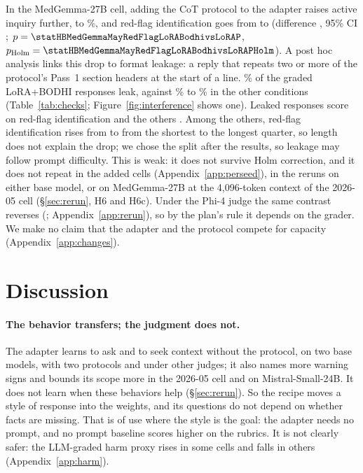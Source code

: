 \documentclass{article}
\newcommand{\bodhi}{BODHI}
\begin{document}
In the MedGemma-27B cell, adding the CoT protocol to the adapter raises active inquiry further, to
\statHBMedGemmaMayActiveInquiryLoRABodhi\%, and red-flag identification goes from
\statHBMedGemmaMayRedFlagLoRA{} to \statHBMedGemmaMayRedFlagLoRABodhi{} (difference
\statHBMedGemmaMayRedFlagLoRABodhivsLoRADiff, 95\% CI \statHBMedGemmaMayRedFlagLoRABodhivsLoRACI;
$p = \statHBMedGemmaMayRedFlagLoRABodhivsLoRAP$, $p_{\text{Holm}} =
\statHBMedGemmaMayRedFlagLoRABodhivsLoRAPHolm$). A post hoc analysis links this drop to format
leakage: a reply that repeats two or more of the protocol's Pass~1 section headers at the start of
a line. \statHBMedGemmaMayLeakBodhiAnalysisFormatLoRABodhi\% of the graded
LoRA+\bodhi{} responses leak, against \statHBMedGemmaMayLeakBodhiAnalysisFormatBase\% to
\statHBMedGemmaMayLeakBodhiAnalysisFormatBaseBodhi\% in the other conditions
(Table~\ref{tab:checks}; Figure~\ref{fig:interference} shows one). Leaked responses score
\statHBMedGemmaMayLeakBodhiAnalysisFormatLoRABodhiRedFlagLeaked{} on red-flag identification and
the others \statHBMedGemmaMayLeakBodhiAnalysisFormatLoRABodhiRedFlagClean. Among the others, red-flag
identification rises from \statHBMedGemmaMayLeakBodhiAnalysisFormatLoRABodhiCleanRedFlagQOne{} to
\statHBMedGemmaMayLeakBodhiAnalysisFormatLoRABodhiCleanRedFlagQFour{} from the shortest to the longest
quarter, so length does not explain the drop; we chose the split after the results, so leakage may
follow prompt difficulty. This is weak: it does not
survive Holm correction, and it does not repeat in the added cells
(Appendix~\ref{app:perseed}), in the reruns on either base model, or on MedGemma-27B at the
4,096-token context of the 2026-05 cell (\S\ref{sec:rerun}, H6 and H6c). Under the Phi-4 judge the
same contrast reverses (\statHBMedGemmaMayJudgePhiFourRedFlagLoRABodhivsLoRADiff;
Appendix~\ref{app:rerun}), so by the plan's rule it depends on the grader. We make no claim that the
adapter and the protocol compete for capacity (Appendix~\ref{app:changes}).

\section{Discussion}
\label{sec:discussion}

\paragraph{The behavior transfers; the judgment does not.} The adapter learns to ask and to seek
context without the protocol, on two base models, with two protocols and under other judges; it
also names more warning signs and bounds its scope more in the 2026-05 cell and on
Mistral-Small-24B. It does not learn when these behaviors help (\S\ref{sec:rerun}). So the recipe
moves a style of response into the weights, and its questions do not depend on whether facts are
missing. That is of use where the style is the goal: the adapter needs no prompt, and no prompt
baseline scores higher on the rubrics. It is not clearly safer: the LLM-graded harm proxy rises in
some cells and falls in others (Appendix~\ref{app:harm}).
\end{document}
